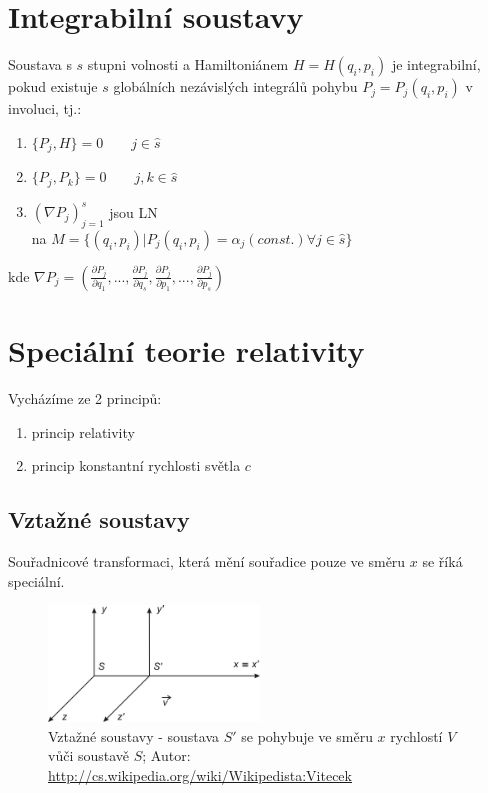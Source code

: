 \documentclass[a5paper,12pt]{article}
\begin{document}
\section{Integrabilní soustavy}

Soustava s $s$ stupni volnosti a Hamiltoniánem $H=H(q_i,p_i)$ je integrabilní, pokud existuje $s$ globálních nezávislých integrálů pohybu $P_j = P_j(q_i, p_i)$ v involuci, tj.:
\begin{enumerate}
	\item $\{P_j, H\} = 0 \qquad j \in \hat{s}$
	\item $\{P_j, P_k\} = 0 \qquad j,k \in \hat{s}$
	\item $(\nabla P_j)_{j=1}^{s}$ jsou LN\\ 
	na $M = \{(q_i, p_i) | P_j(q_i, p_i) = \alpha_j (const.) \forall j \in \hat{s} \}$
\end{enumerate}

\noindent kde $\nabla P_j = (\frac{\partial P_j}{\partial q_1}, ..., \frac{\partial P_j}{\partial q_s}, \frac{\partial P_j}{\partial p_1}, ..., \frac{\partial P_j}{\partial p_s})$

\newpage

\section{Speciální teorie relativity}

Vycházíme ze 2 principů:
\begin{enumerate}
	\item princip relativity
	\item princip konstantní rychlosti světla $c$
\end{enumerate}

\subsection{Vztažné soustavy}
Souřadnicové transformaci, která mění souřadice pouze ve směru $x$ se říká speciální.

\begin{figure}[h!]
	\centering
	\includegraphics[width=0.5\textwidth]{data/Vztazna_soustava.png}
	\caption{Vztažné soustavy - soustava $S'$ se pohybuje ve směru $x$ rychlostí $V$ vůči soustavě $S$; Autor: \url{http://cs.wikipedia.org/wiki/Wikipedista:Vitecek}}
\end{figure}
\end{document}
